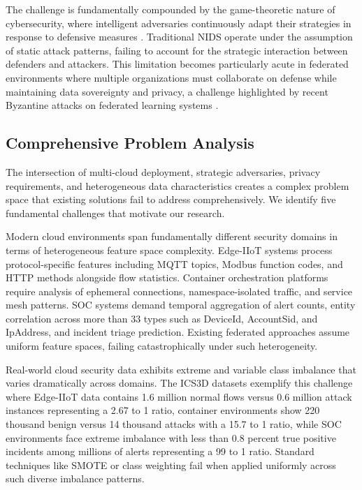 \documentclass[12pt,a4paper]{article}
\theoremstyle{definition}
\begin{document}
The challenge is fundamentally compounded by the game-theoretic nature of cybersecurity, where intelligent adversaries continuously adapt their strategies in response to defensive measures \cite{manshaei2013game}. Traditional NIDS operate under the assumption of static attack patterns, failing to account for the strategic interaction between defenders and attackers. This limitation becomes particularly acute in federated environments where multiple organizations must collaborate on defense while maintaining data sovereignty and privacy, a challenge highlighted by recent Byzantine attacks on federated learning systems \cite{fang2020local}.

\subsection{Comprehensive Problem Analysis}

The intersection of multi-cloud deployment, strategic adversaries, privacy requirements, and heterogeneous data characteristics creates a complex problem space that existing solutions fail to address comprehensively. We identify five fundamental challenges that motivate our research.

Modern cloud environments span fundamentally different security domains in terms of heterogeneous feature space complexity. Edge-IIoT systems process protocol-specific features including MQTT topics, Modbus function codes, and HTTP methods alongside flow statistics. Container orchestration platforms require analysis of ephemeral connections, namespace-isolated traffic, and service mesh patterns. SOC systems demand temporal aggregation of alert counts, entity correlation across more than 33 types such as DeviceId, AccountSid, and IpAddress, and incident triage prediction. Existing federated approaches assume uniform feature spaces, failing catastrophically under such heterogeneity.

Real-world cloud security data exhibits extreme and variable class imbalance that varies dramatically across domains. The ICS3D datasets exemplify this challenge where Edge-IIoT data contains 1.6 million normal flows versus 0.6 million attack instances representing a 2.67 to 1 ratio, container environments show 220 thousand benign versus 14 thousand attacks with a 15.7 to 1 ratio, while SOC environments face extreme imbalance with less than 0.8 percent true positive incidents among millions of alerts representing a 99 to 1 ratio. Standard techniques like SMOTE or class weighting fail when applied uniformly across such diverse imbalance patterns.
\end{document}

